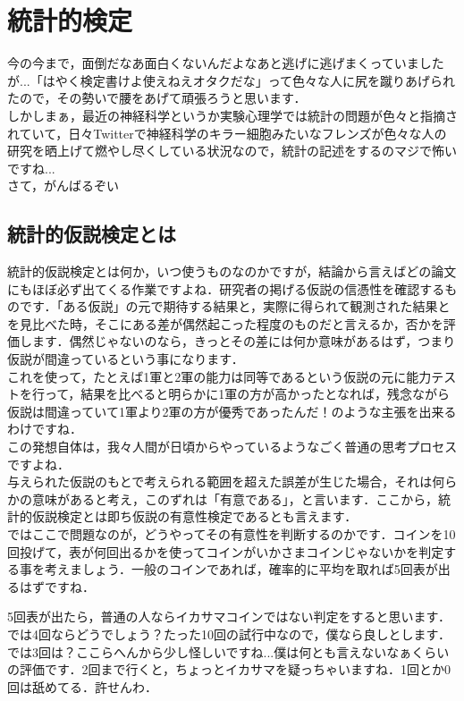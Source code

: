 \documentclass[11pt,a4paper]{ujreport} 	%
\begin{document}
\chapter{統計的検定}
今の今まで，面倒だなあ面白くないんだよなあと逃げに逃げまくっていましたが...「はやく検定書けよ使えねえオタクだな」って色々な人に尻を蹴りあげられたので，その勢いで腰をあげて頑張ろうと思います．\\

しかしまぁ，最近の神経科学というか実験心理学では統計の問題が色々と指摘されていて，日々Twitterで神経科学のキラー細胞みたいなフレンズが色々な人の研究を晒上げて燃やし尽くしている状況なので，統計の記述をするのマジで怖いですね...\\


さて，がんばるぞい\\

\section{統計的仮説検定とは}
統計的仮説検定とは何か，いつ使うものなのかですが，結論から言えばどの論文にもほぼ必ず出てくる作業ですよね．研究者の掲げる仮説の信憑性を確認するものです．「ある仮説」の元で期待する結果と，実際に得られて観測された結果とを見比べた時，そこにある差が偶然起こった程度のものだと言えるか，否かを評価します．偶然じゃないのなら，きっとその差には何か意味があるはず，つまり仮説が間違っているという事になります．\\

これを使って，たとえば1軍と2軍の能力は同等であるという仮説の元に能力テストを行って，結果を比べると明らかに1軍の方が高かったとなれば，残念ながら仮説は間違っていて1軍より2軍の方が優秀であったんだ！のような主張を出来るわけですね．\\

この発想自体は，我々人間が日頃からやっているようなごく普通の思考プロセスですよね．\\

与えられた仮説のもとで考えられる範囲を超えた誤差が生じた場合，それは何らかの意味があると考え，このずれは「有意である」，と言います．ここから，統計的仮説検定とは即ち仮説の有意性検定であるとも言えます．\\

ではここで問題なのが，どうやってその有意性を判断するのかです．コインを10回投げて，表が何回出るかを使ってコインがいかさまコインじゃないかを判定する事を考えましょう．一般のコインであれば，確率的に平均を取れば5回表が出るはずですね．

5回表が出たら，普通の人ならイカサマコインではない判定をすると思います．では4回ならどうでしょう？たった10回の試行中なので，僕なら良しとします．では3回は？ここらへんから少し怪しいですね...僕は何とも言えないなぁくらいの評価です．2回まで行くと，ちょっとイカサマを疑っちゃいますね．1回とか0回は舐めてる．許せんわ．\\\\
\end{document}
